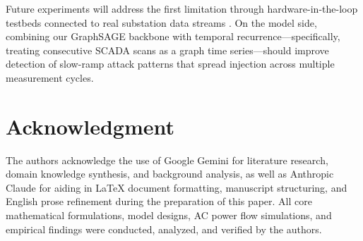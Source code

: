 \documentclass[conference]{IEEEtran}
\begin{document}
Future experiments will address the first limitation through hardware-in-the-loop testbeds connected to real substation data streams \cite{b1}. On the model side, combining our GraphSAGE backbone with temporal recurrence---specifically, treating consecutive SCADA scans as a graph time series---should improve detection of slow-ramp attack patterns that spread injection across multiple measurement cycles.

\section*{Acknowledgment}
The authors acknowledge the use of Google Gemini for literature research, domain knowledge synthesis, and background analysis, as well as Anthropic Claude for aiding in LaTeX document formatting, manuscript structuring, and English prose refinement during the preparation of this paper. All core mathematical formulations, model designs, AC power flow simulations, and empirical findings were conducted, analyzed, and verified by the authors.
\end{document}
